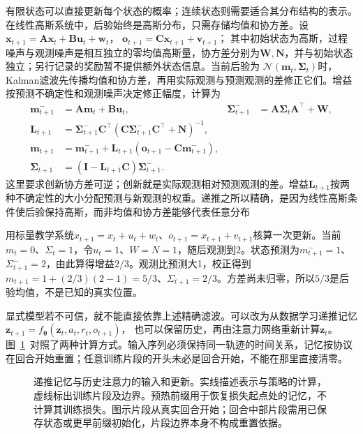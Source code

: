 有限状态可以直接更新每个状态的概率；连续状态则需要适合其分布结构的表示。在线性高斯系统中，后验始终是高斯分布，只需存储均值和协方差。设
$\bm x_{t+1}=\bm A\bm x_t+\bm B\bm u_t+\bm w_t$，
$\bm o_{t+1}=\bm C\bm x_{t+1}+\bm v_{t+1}$；
其中初始状态为高斯，过程噪声与观测噪声是相互独立的零均值高斯量，协方差分别为$\bm W,\bm N$，并与初始状态独立；另行记录的奖励暂不提供额外状态信息。当前后验为
$\mathcal N(\bm m_t,\bm\Sigma_t)$时，Kalman滤波先传播均值和协方差，再用实际观测与预测观测的差修正它们。增益按预测不确定性和观测噪声决定修正幅度，计算为
\begin{align}
  \label{eq:rl-information-kalman}
  \bm m^-_{t+1}&=\bm A\bm m_t+\bm B\bm u_t,&
  \bm\Sigma^-_{t+1}&=\bm A\bm\Sigma_t\bm A^\top+\bm W,\nonumber\\
  \bm L_{t+1}&=\bm\Sigma^-_{t+1}\bm C^\top
     (\bm C\bm\Sigma^-_{t+1}\bm C^\top+\bm N)^{-1},\nonumber\\
  \bm m_{t+1}&=\bm m^-_{t+1}
       +\bm L_{t+1}(\bm o_{t+1}-\bm C\bm m^-_{t+1}),\nonumber\\
  \bm\Sigma_{t+1}&=(\bm I-\bm L_{t+1}\bm C)\bm\Sigma^-_{t+1}.
\end{align}
这里要求创新协方差可逆；创新就是实际观测相对预测观测的差。增益$\bm L_{t+1}$按两种不确定性的大小分配预测与新观测的权重。递推之所以精确，是因为线性高斯条件使后验保持高斯，而非均值和协方差能够代表任意分布

\begin{example}[一次标量滤波]
  \label{ex:rl-information-kalman}
  用标量教学系统$x_{t+1}=x_t+u_t+w_t$、$o_{t+1}=x_{t+1}+v_{t+1}$核算一次更新。当前$m_t=0$、$\Sigma_t=1$，令$u_t=1$、$W=N=1$，随后观测到2。状态预测为$m^-_{t+1}=1$、$\Sigma^-_{t+1}=2$，由此算得增益$2/3$。观测比预测大1，校正得到$m_{t+1}=1+(2/3)(2-1)=5/3$、$\Sigma_{t+1}=2/3$。方差尚未归零，所以$5/3$是后验均值，不是已知的真实位置。
\end{example}

显式模型若不可信，就不能直接依靠上述精确滤波。可以改为从数据学习递推记忆
$\bm z_{t+1}=f_{\bm\theta}(\bm z_t,a_t,r_t,o_{t+1})$，
也可以保留历史，再由注意力网络重新计算$\bm z_t$。图~\ref{fig:rl-information-memory}~对照了两种计算方式。输入序列必须保持同一轨迹的时间关系，记忆按协议在回合开始重置；任意训练片段的开头未必是回合开始，不能在那里直接清零。

\begin{figure}[htbp]
  \centering
  
  \caption{递推记忆与历史注意力的输入和更新。实线描述表示与策略的计算，虚线标出训练片段及边界。预热前缀用于恢复损失起点处的记忆，不计算其训练损失。图示片段从真实回合开始；回合中部片段需用已保存状态或更早前缀初始化，片段边界本身不构成重置依据。}
  \label{fig:rl-information-memory}
\end{figure}

